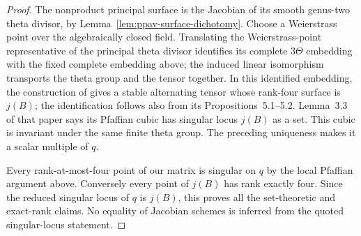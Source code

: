 \begin{proof}
The nonproduct principal surface is the Jacobian of its smooth
genus-two theta divisor, by
Lemma~\ref{lem:ppav-surface-dichotomy}. Choose a Weierstrass point
over the algebraically closed field. Translating the Weierstrass-point
representative of the principal theta divisor identifies its complete
$3\Theta$ embedding with the fixed complete embedding above; the induced
linear isomorphism transports the theta group and the tensor together.
In this identified embedding, the construction of
\citet[Section~4, Lemmas~4.1--4.4 and Proposition~4.5(a)]
{RainsSam2018Trivectors} gives a stable alternating tensor whose
rank-four surface is $j(B)$; the identification follows also from
its Propositions~5.1--5.2. Lemma~3.3 of that paper says its Pfaffian
cubic has singular locus $j(B)$ as a set. This cubic is invariant
under the same finite theta group. The preceding uniqueness makes
it a scalar multiple of $q$.

Every rank-at-most-four point of our matrix is singular on $q$ by
the local Pfaffian argument above. Conversely every point of
$j(B)$ has rank exactly four. Since the reduced singular locus
of $q$ is $j(B)$, this proves all the set-theoretic and exact-rank
claims. No equality of Jacobian schemes is inferred from the
quoted singular-locus statement.
\end{proof}


